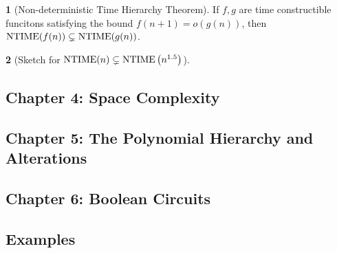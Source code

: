 \documentclass[10pt]{article}
\theoremstyle{definition}
\newtheorem{note}{}[section]
\begin{document}
\begin{note}[Non-deterministic Time Hierarchy Theorem]
  If $f, g$ are time constructible funcitons satisfying the bound
  $f(n + 1) = o(g(n))$,
  then $\mathrm{NTIME}(f(n)) \subsetneq \mathrm{NTIME}(g(n))$.
\end{note}

\begin{note}[Sketch for $\mathrm{NTIME}(n) \subsetneq \mathrm{NTIME}\left(n^{1.5}\right)$]
\end{note}

\subsection*{Chapter 4: Space Complexity}


\subsection*{Chapter 5: The Polynomial Hierarchy and Alterations}



\subsection*{Chapter 6: Boolean Circuits}


\subsection*{Examples}
\end{document}
